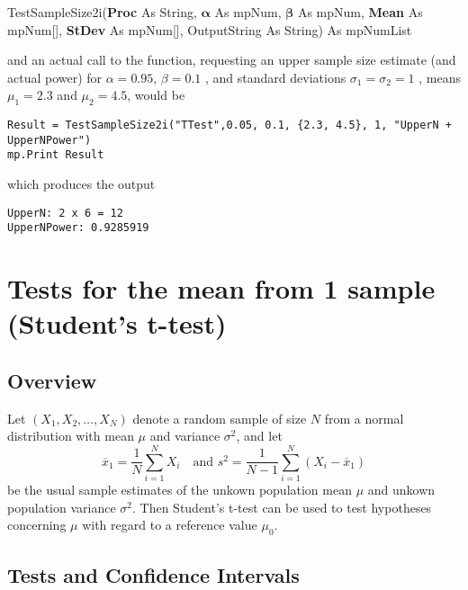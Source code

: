 \vspace{0.3cm}
\textsf{TestSampleSize2i(\textbf{Proc} As String, $\boldsymbol{\alpha}$ As mpNum, $\boldsymbol{\beta}$ As mpNum, \textbf{Mean} As mpNum[], \textbf{StDev} As mpNum[], OutputString As String) As mpNumList}

\vspace{0.3cm}
and an actual call to the function, requesting an upper sample size estimate (and actual power) for $\alpha = 0.95$, $\beta=0.1$ , and standard deviations $\sigma_1=\sigma_2=1$ , means $\mu_1=2.3$ and $\mu_2=4.5$,   would be

\begin{lstlisting}
Result = TestSampleSize2i("TTest",0.05, 0.1, {2.3, 4.5}, 1, "UpperN + UpperNPower")
mp.Print Result
\end{lstlisting}
which produces the output

\begin{verbatim}
UpperN: 2 x 6 = 12
UpperNPower: 0.9285919
\end{verbatim}


\newpage
\section{Tests for the mean from 1 sample (Student's t-test)}
\label{1SampleTTest}

\subsection{Overview}
\label{1SampleTTestOverview}

Let $(X_1, X_2, \ldots, X_N)$ denote a random sample of size $N$ from a normal distribution with mean $\mu$ and variance $\sigma^2$, and let
\begin{equation}
	\overline{x}_1 = \frac{1}{N} \sum_{i=1}^N X_i \quad \text{and } s^2 = \frac{1}{N-1} \sum_{i=1}^N (X_i - \overline{x}_1)
\end{equation}
be the usual sample estimates of the unkown population mean $\mu$ and unkown population variance $\sigma^2$. Then Student's t-test can be used to test hypotheses concerning $\mu$ with regard to a reference value $\mu_0$.



\subsection{Tests and Confidence Intervals}

